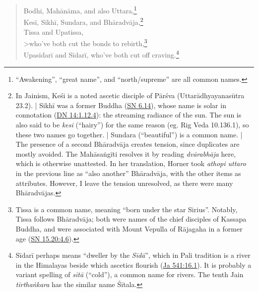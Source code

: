 \documentclass[12pt,openany]{book}%
\begin{document}
\begin{verse}
Bodhi, \textsanskrit{Mahānāma}, and also Uttara,\footnote{“Awakening”, “great name”, and “north/supreme” are all common names. } \\
\textsanskrit{Kesī}, \textsanskrit{Sikhī}, Sundara, and \textsanskrit{Bhāradvāja},\footnote{In Jainism, \textsanskrit{Keśi} is a noted ascetic disciple of \textsanskrit{Pārśva} (\textsanskrit{Uttarādhyayanasūtra} 23.2). | \textsanskrit{Sikhī} was a former Buddha (\href{https://suttacentral.net/sn6.14/en/sujato}{SN 6.14}), whose name is solar in connotation (\href{https://suttacentral.net/dn14/en/sujato\#1.12.4}{DN 14:1.12.4}): the streaming radiance of the sun. The sun is also said to be \textit{kesi} (“hairy”) for the same reason (eg. Rig Veda 10.136.1), so these two names go together. | Sundara (“beautiful”) is a common name. | The presence of a second \textsanskrit{Bhāradvāja} creates tension, since duplicates are mostly avoided. The \textsanskrit{Mahāsaṅgīti} resolves it by reading \textit{\textsanskrit{dvārabhāja}} here, which is otherwise unattested. In her translation, Horner took \textit{athopi uttaro} in the previous line as “also another” \textsanskrit{Bhāradvāja}, with the other items as attributes. However, I leave the tension unresolved, as there were many \textsanskrit{Bhāradvājas}. } \\
Tissa and Upatissa, \\>who’ve both cut the bonds to rebirth,\footnote{Tissa is a common name, meaning “born under the star Sirius”. Notably, Tissa follows \textsanskrit{Bhāradvāja}; both were names of the chief disciples of Kassapa Buddha, and were associated with Mount Vepulla of \textsanskrit{Rājagaha} in a former age (\href{https://suttacentral.net/sn15.20/en/sujato\#4.6}{SN 15.20:4.6}). } \\
\textsanskrit{Upasīdarī} and \textsanskrit{Sīdarī}, who’ve both cut off craving.\footnote{\textsanskrit{Sīdarī} perhaps means “dweller by the \textit{\textsanskrit{Sīdā}}”, which in Pali tradition is a river in the Himalayas beside which ascetics flourish (\href{https://suttacentral.net/ja541/en/sujato\#16.1}{Ja 541:16.1}). It is probably a variant spelling of \textit{\textsanskrit{sītā}} (“cold”), a common name for rivers. The tenth Jain \textit{\textsanskrit{tīrthaṅkara}} has the similar name \textsanskrit{Śītala}. } 


\end{verse}
\end{document}
